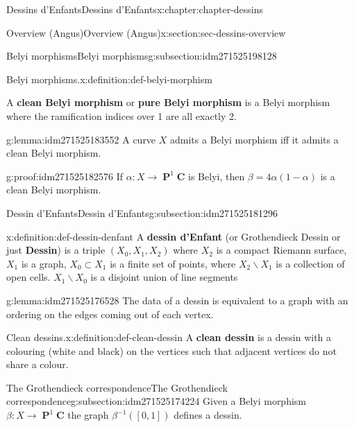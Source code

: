 \documentclass[oneside,10pt,]{book}
\newcommand{\terminology}[1]{\textbf{#1}}
\numberwithin{equation}{section}
\newcommand{\lb}{[}
\newcommand{\rb}{]}
\newcommand{\CC}{\mathbf{C}}
\DeclareMathOperator{\PP}{\mathbf{P}}
\begin{document}
\begin{chapterptx}{Dessins d'Enfants}{}{Dessins d'Enfants}{}{}{x:chapter:chapter-dessins}
\begin{sectionptx}{Overview (Angus)}{}{Overview (Angus)}{}{}{x:section:sec-dessins-overview}
\begin{subsectionptx}{Belyi morphisms}{}{Belyi morphisms}{}{}{g:subsection:idm271525198128}
\begin{definition}{Belyi morphisms.}{x:definition:def-belyi-morphism}
\par
A \terminology{clean Belyi morphism} or \terminology{pure Belyi morphism} is a Belyi morphism where the ramification indices over 1 are all exactly 2.%
\end{definition}
\begin{lemma}{}{}{g:lemma:idm271525183552}%
A curve \(X\) admits a Belyi morphism iff it admits a clean Belyi morphism.%
\end{lemma}
\begin{proofptx}{}{g:proof:idm271525182576}
If \(\alpha \colon X\to \PP^1 \CC\) is Belyi, then \(\beta = 4\alpha(1-\alpha)\) is a clean Belyi morphism.%
\end{proofptx}
\end{subsectionptx}
%
%
\typeout{************************************************}
\typeout{************************************************}
%
\begin{subsectionptx}{Dessin d'Enfants}{}{Dessin d'Enfants}{}{}{g:subsection:idm271525181296}
\begin{definition}{}{x:definition:def-dessin-denfant}%
A \terminology{dessin d'Enfant} (or Grothendieck Dessin or just \terminology{Dessin}) is a triple \((X_0,X_1,X_2)\) where \(X_2\) is a compact Riemann surface, \(X_1\) is a graph, \(X_0 \subset X_1\) is a finite set of points, where \(X_2 \smallsetminus X_1\) is a collection of open cells. \(X_1 \smallsetminus X_0\) is a disjoint union of line segments%
\end{definition}
\begin{lemma}{}{}{g:lemma:idm271525176528}%
The data of a dessin is equivalent to a graph with an ordering on the edges coming out of each vertex.%
\end{lemma}
\begin{definition}{Clean dessins.}{x:definition:def-clean-dessin}%
A \terminology{clean dessin} is a dessin with a colouring (white and black) on the vertices such that adjacent vertices do not share a colour.%
\end{definition}
\end{subsectionptx}
%
%
\typeout{************************************************}
\typeout{************************************************}
%
\begin{subsectionptx}{The Grothendieck correspondence}{}{The Grothendieck correspondence}{}{}{g:subsection:idm271525174224}
Given a Belyi morphism \(\beta\colon X \to \PP^1 \CC\) the graph \(\beta^{-1}(\lb 0,1\rb)\) defines a dessin.%

\end{subsectionptx}
\end{sectionptx}
\end{chapterptx}
\end{document}
